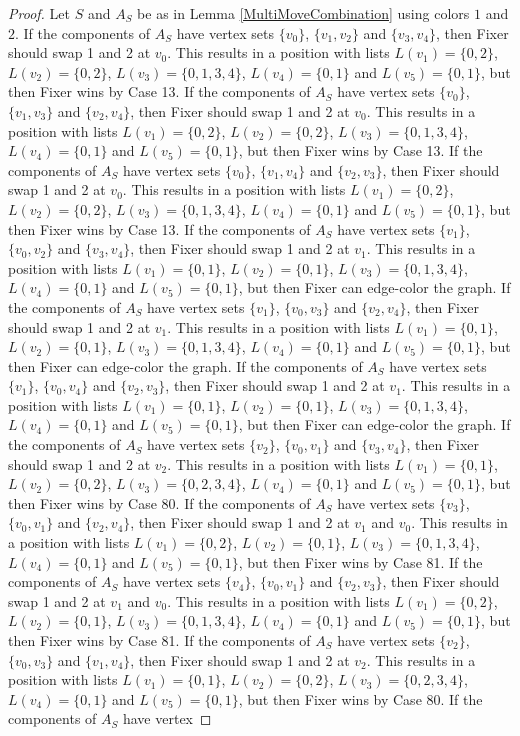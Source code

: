 \documentclass[12pt]{amsart}
\theoremstyle{plain}
\theoremstyle{definition}
\theoremstyle{remark}
\begin{document}
\begin{proof}
Let $S$ and $A_S$ be as in Lemma \ref{MultiMoveCombination} using colors $1$ and $2$. If the components of $A_S$ have vertex sets $\{v_0\}$, $\{v_1, v_2\}$ and $\{v_3, v_4\}$, then Fixer should swap 1 and 2 at $v_0$. This results in a position with lists $L(v_1) = \{0, 2\}$, $L(v_2) = \{0, 2\}$, $L(v_3) = \{0, 1, 3, 4\}$, $L(v_4) = \{0, 1\}$ and $L(v_5) = \{0, 1\}$, but then Fixer wins by Case 13. If the components of $A_S$ have vertex sets $\{v_0\}$, $\{v_1, v_3\}$ and $\{v_2, v_4\}$, then Fixer should swap 1 and 2 at $v_0$. This results in a position with lists $L(v_1) = \{0, 2\}$, $L(v_2) = \{0, 2\}$, $L(v_3) = \{0, 1, 3, 4\}$, $L(v_4) = \{0, 1\}$ and $L(v_5) = \{0, 1\}$, but then Fixer wins by Case 13. If the components of $A_S$ have vertex sets $\{v_0\}$, $\{v_1, v_4\}$ and $\{v_2, v_3\}$, then Fixer should swap 1 and 2 at $v_0$. This results in a position with lists $L(v_1) = \{0, 2\}$, $L(v_2) = \{0, 2\}$, $L(v_3) = \{0, 1, 3, 4\}$, $L(v_4) = \{0, 1\}$ and $L(v_5) = \{0, 1\}$, but then Fixer wins by Case 13. If the components of $A_S$ have vertex sets $\{v_1\}$, $\{v_0, v_2\}$ and $\{v_3, v_4\}$, then Fixer should swap 1 and 2 at $v_1$. This results in a position with lists $L(v_1) = \{0, 1\}$, $L(v_2) = \{0, 1\}$, $L(v_3) = \{0, 1, 3, 4\}$, $L(v_4) = \{0, 1\}$ and $L(v_5) = \{0, 1\}$, but then Fixer can edge-color the graph. If the components of $A_S$ have vertex sets $\{v_1\}$, $\{v_0, v_3\}$ and $\{v_2, v_4\}$, then Fixer should swap 1 and 2 at $v_1$. This results in a position with lists $L(v_1) = \{0, 1\}$, $L(v_2) = \{0, 1\}$, $L(v_3) = \{0, 1, 3, 4\}$, $L(v_4) = \{0, 1\}$ and $L(v_5) = \{0, 1\}$, but then Fixer can edge-color the graph. If the components of $A_S$ have vertex sets $\{v_1\}$, $\{v_0, v_4\}$ and $\{v_2, v_3\}$, then Fixer should swap 1 and 2 at $v_1$. This results in a position with lists $L(v_1) = \{0, 1\}$, $L(v_2) = \{0, 1\}$, $L(v_3) = \{0, 1, 3, 4\}$, $L(v_4) = \{0, 1\}$ and $L(v_5) = \{0, 1\}$, but then Fixer can edge-color the graph. If the components of $A_S$ have vertex sets $\{v_2\}$, $\{v_0, v_1\}$ and $\{v_3, v_4\}$, then Fixer should swap 1 and 2 at $v_2$. This results in a position with lists $L(v_1) = \{0, 1\}$, $L(v_2) = \{0, 2\}$, $L(v_3) = \{0, 2, 3, 4\}$, $L(v_4) = \{0, 1\}$ and $L(v_5) = \{0, 1\}$, but then Fixer wins by Case 80. If the components of $A_S$ have vertex sets $\{v_3\}$, $\{v_0, v_1\}$ and $\{v_2, v_4\}$, then Fixer should swap 1 and 2 at $v_1$ and $v_0$. This results in a position with lists $L(v_1) = \{0, 2\}$, $L(v_2) = \{0, 1\}$, $L(v_3) = \{0, 1, 3, 4\}$, $L(v_4) = \{0, 1\}$ and $L(v_5) = \{0, 1\}$, but then Fixer wins by Case 81. If the components of $A_S$ have vertex sets $\{v_4\}$, $\{v_0, v_1\}$ and $\{v_2, v_3\}$, then Fixer should swap 1 and 2 at $v_1$ and $v_0$. This results in a position with lists $L(v_1) = \{0, 2\}$, $L(v_2) = \{0, 1\}$, $L(v_3) = \{0, 1, 3, 4\}$, $L(v_4) = \{0, 1\}$ and $L(v_5) = \{0, 1\}$, but then Fixer wins by Case 81. If the components of $A_S$ have vertex sets $\{v_2\}$, $\{v_0, v_3\}$ and $\{v_1, v_4\}$, then Fixer should swap 1 and 2 at $v_2$. This results in a position with lists $L(v_1) = \{0, 1\}$, $L(v_2) = \{0, 2\}$, $L(v_3) = \{0, 2, 3, 4\}$, $L(v_4) = \{0, 1\}$ and $L(v_5) = \{0, 1\}$, but then Fixer wins by Case 80. If the components of $A_S$ have vertex 
\end{proof}
\end{document}
